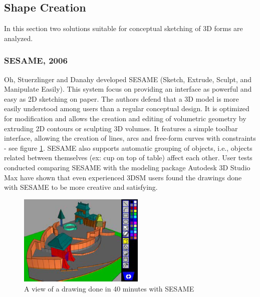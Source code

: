 \subsection{Shape Creation}


In this section two solutions suitable for conceptual sketching of 3D forms are analyzed.

\subsubsection{SESAME, 2006}

Oh, Stuerzlinger and Danahy \cite{SESAME3D} developed SESAME
(Sketch, Extrude, Sculpt, and Manipulate Easily).
This system focus on providing an interface as powerful and easy as 2D sketching on paper.
The authors defend that a 3D model is more easily understood among users than a regular conceptual design.
It is optimized for modification and allows the creation and editing of volumetric geometry
by extruding 2D contours or sculpting 3D volumes.
It features a simple toolbar interface, allowing the creation of lines,
arcs and free-form curves with constraints - see figure \ref{FIG-SESAME}.
SESAME also supports automatic grouping of objects, i.e., objects related
between themselves (ex: cup on top of table) affect each other.
User tests conducted comparing SESAME with the modeling package
Autodesk 3D Studio Max have shown that even experienced 3DSM users found
the drawings done with SESAME to be more creative and satisfying.

\begin{figure}[!ht]
	\centering
	\includegraphics[width=6cm]{gfx/sesame.png}
	\caption{A view of a drawing done in 40 minutes with SESAME}
	\label{FIG-SESAME}
\end{figure}


